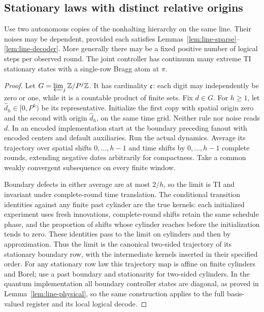 \subsection{Stationary laws with distinct relative origins}
\begin{proposition}\label{prop:line-phases}
Use two autonomous copies of the nonhalting hierarchy on the same
line. Their noises may be dependent, provided each satisfies
Lemmas~\ref{lem:line-sparse}--\ref{lem:line-decoder}.
More generally there may be a fixed positive number of logical
steps per observed round. The joint controller has continuum many
extreme TI stationary states with a single-row Bragg atom at $\pi$.
\end{proposition}
\begin{proof}
Let $G=\varprojlim_j\mathbb Z/P^j\mathbb Z$. It has cardinality $\mathfrak c$: each digit
may independently be zero or one, while it is a countable product
of finite sets. Fix $d\in G$. For $h\ge1$, let $\hat d_h\in[0,P^h)$ be
its representative. Initialize the first copy with spatial origin
zero and the second with origin $\hat d_h$, on the same time grid.
Neither rule nor noise reads $d$. In an encoded implementation start
at the boundary preceding fanout with encoded centers and default
auxiliaries. Run the actual dynamics. Average its trajectory over
spatial shifts $0,\ldots,h-1$ and time shifts by $0,\ldots,h-1$
complete rounds, extending negative dates arbitrarily for compactness.
Take a common weakly convergent subsequence on every finite window.

Boundary defects in either average are at most $2/h$, so the limit
is TI and invariant under complete-round time translation. The
conditional transition identities against any finite past cylinder
are the true kernels: each initialized experiment uses fresh
innovations, complete-round shifts retain the same schedule phase,
and the proportion of shifts whose cylinder reaches before the
initialization tends to zero. These identities pass to the limit
on cylinders and then by approximation. Thus the limit is the
canonical two-sided trajectory of its stationary boundary row,
with the intermediate kernels inserted in their specified order.
For any stationary row law this trajectory map is affine on finite
cylinders and Borel; use a past boundary and stationarity for
two-sided cylinders. In the quantum implementation all boundary
controller states are diagonal, as proved in
Lemma~\ref{lem:line-physical}, so the same construction applies to the
full basis-valued register and its local logical decode.


\end{proof}
